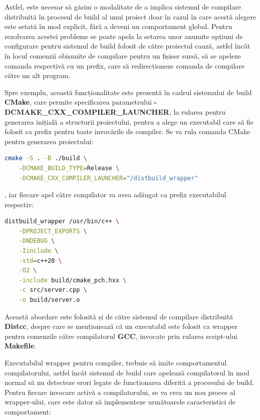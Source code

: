 Astfel, este necesar să găsim o modalitate de a implica sistemul de compilare distribuită în procesul de build al unui
proiect doar în cazul în care acestă alegere este setată în mod explicit, fără a deveni un comportament global. Pentru rezolvarea
acestei probleme se poate apela la setarea unor anumite opțiuni de configurare pentru sistemul de build folosit de către proiectul
cauză, astfel încât în locul comenzii obișnuite de compilare pentru un fișiser sursă, să se apeleze comanda respectivă cu un prefix, care să redirecționeze
comanda de compilare către un alt program.

Spre exemplu, această funcționalitate este prezentă în cadrul sistemului de build \textbf{CMake}, care permite specificarea parametrului
\textbf{-DCMAKE\_CXX\_COMPILER\_LAUNCHER}, la rularea pentru generarea inițială a structurii proiectului, pentru a alege 
un executabil care să fie folosit ca prefix pentru toate invocările de compiler. Se va rula comanda CMake pentru generarea proiectului:

\begin{lstlisting}[language=bash]
cmake -S . -B ./build \
    -DCMAKE_BUILD_TYPE=Release \
    -DCMAKE_CXX_COMPILER_LAUNCHER="/distbuild_wrapper"
\end{lstlisting}

, iar fiecare apel către compilator va avea adăugat ca prefix executabilul respectiv:

\begin{lstlisting}[language=bash]
distbuild_wrapper /usr/bin/c++ \
    -DPROJECT_EXPORTS \
    -DNDEBUG \
    -Iinclude \
    -std=c++20 \
    -O2 \
    -include build/cmake_pch.hxx \
    -c src/server.cpp \
    -o build/server.o    
\end{lstlisting}

Această abordare este folosită și de către sistemul de compilare distribuită \textbf{Distcc}\cite{distcc}, despre care se menționează că
un executabil este folosit ca wrapper pentru comenzile către compilatorul \textbf{GCC}, invocate prin rularea script-ului \textbf{Makefile}.

Executabilul wrapper pentru compiler, trebuie să imite comportamentul compilatorului, astfel încât sistemul de build care apelează compilatorul
în mod normal să nu detecteze erori legate de funcționarea diferită a procesului de build. Pentru fiecare invocare activă a compilatorului,
se va crea un nou proces al wrapper-ului, care este dator să implementeze următoarele caracteristici de comportament:

